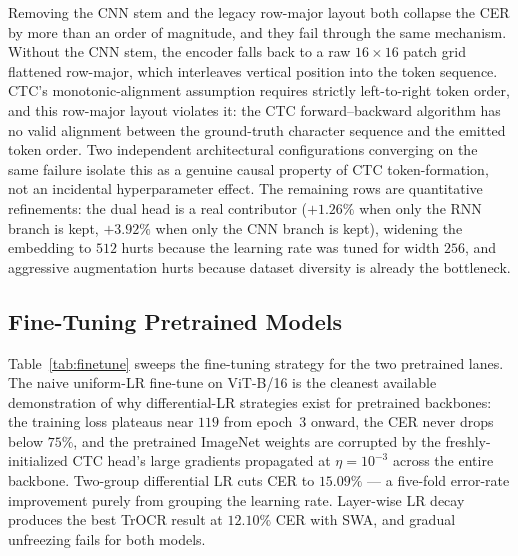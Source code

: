 Removing the CNN stem and the legacy row-major layout both collapse the CER by more than an order of magnitude, and they fail through the same mechanism. Without the CNN stem, the encoder falls back to a raw $16 \times 16$ patch grid flattened row-major, which interleaves vertical position into the token sequence. CTC's monotonic-alignment assumption requires strictly left-to-right token order, and this row-major layout violates it: the CTC forward--backward algorithm has no valid alignment between the ground-truth character sequence and the emitted token order. Two independent architectural configurations converging on the same failure isolate this as a genuine causal property of CTC token-formation, not an incidental hyperparameter effect. The remaining rows are quantitative refinements: the dual head is a real contributor ($+1.26\%$ when only the RNN branch is kept, $+3.92\%$ when only the CNN branch is kept), widening the embedding to $512$ hurts because the learning rate was tuned for width $256$, and aggressive augmentation hurts because dataset diversity is already the bottleneck.

\subsection{Fine-Tuning Pretrained Models}
\label{sec:res_finetune}

Table~\ref{tab:finetune} sweeps the fine-tuning strategy for the two pretrained lanes. The naive uniform-LR fine-tune on ViT-B/16 is the cleanest available demonstration of why differential-LR strategies exist for pretrained backbones: the training loss plateaus near $119$ from epoch~$3$ onward, the CER never drops below $75\%$, and the pretrained ImageNet weights are corrupted by the freshly-initialized CTC head's large gradients propagated at $\eta = 10^{-3}$ across the entire backbone. Two-group differential LR cuts CER to $15.09\%$ --- a five-fold error-rate improvement purely from grouping the learning rate. Layer-wise LR decay produces the best TrOCR result at $12.10\%$ CER with SWA, and gradual unfreezing fails for both models.

